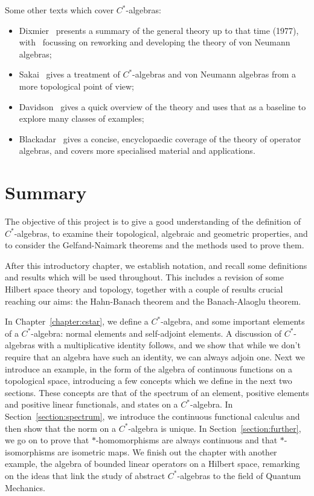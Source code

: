 \documentclass[11pt,a4paper]{report}
\theoremstyle{plain}
\theoremstyle{definition}
\newcommand{\1}{\mathbbm{1}}
\begin{document}
	
Some other texts which cover $C^\ast$-algebras: 
\begin{itemize}
	\item 	Dixmier~\cite{dixmier77} presents a summary of the general theory up to 
	that time (1977), with~\cite{dixmier81} focussing on reworking and developing 
	the theory of von Neumann algebras; 
	\item 	Sakai~\cite{sakai71} gives a treatment of $C^\ast$-algebras and von 
	Neumann algebras from a more topological point of view; 
	\item	Davidson~\cite{davidson96} gives a quick overview of the theory and uses 
	that as a baseline to explore many classes of examples;
	\item 	Blackadar~\cite{blackadar06} gives a concise, encyclopaedic coverage of 
	the theory of operator algebras, and covers more specialised material and 
	applications. 

\end{itemize}
	
\section{Summary}

The objective of this project is to give a good understanding of the definition 
of $C^\ast$-algebras, to examine their topological, algebraic and geometric 
properties, and to consider the Gelfand-Naimark theorems and the methods used 
to prove them.

After this introductory chapter, we establish notation, and recall some 
definitions and results which will be used throughout. This includes a revision
of some Hilbert space theory and topology, together with a couple of results
crucial reaching our aims: the Hahn-Banach theorem and the Banach-Alaoglu theorem.

In Chapter~\ref{chapter:cstar}, we define a $C^\ast$-algebra, and some 
important elements of a $C^\ast$-algebra: normal elements and self-adjoint 
elements. A discussion of $C^\ast$-algebras with a multiplicative identity 
follows, and we show that while we don't require that an algebra have such an 
identity, we can always adjoin one. Next we introduce an example, in the form 
of the algebra of continuous functions on a topological space, introducing a 
few concepts which we define in the next two sections. These concepts are that 
of the spectrum of an element, positive elements and positive linear functionals,
and states on a $C^\ast$-algebra. In Section~\ref{section:spectrum}, we 
introduce the continuous functional calculus and then show that the norm on a 
$C^\ast$-algebra is unique. In Section~\ref{section:further}, we go on to prove 
that $\ast$-homomorphisms are always continuous and that $\ast$-isomorphisms are 
isometric maps. We finish out the chapter with another example, the algebra of 
bounded linear operators on a Hilbert space, remarking on the ideas that 
link the study of abstract $C^\ast$-algebras to the field of Quantum Mechanics.
\end{document}
